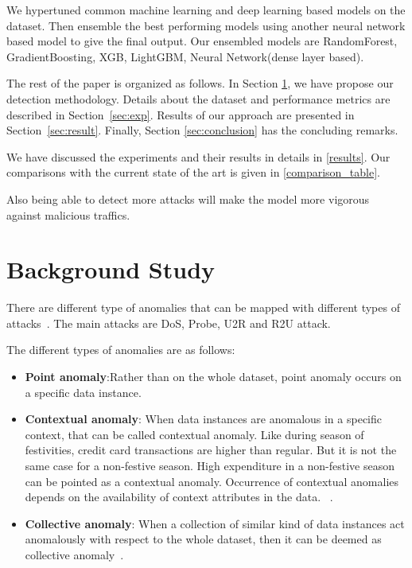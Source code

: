 \documentclass[14pt, conference]{IEEEtran}
\begin{document}
We hypertuned common machine learning and deep learning based models on the dataset. Then ensemble the best performing models using another neural network based model to give the final output. Our ensembled models are RandomForest, GradientBoosting, XGB, LightGBM, Neural Network(dense layer based).

The rest of the paper is organized as follows. In Section \ref{}, we have  propose our detection methodology. Details about the dataset and performance metrics are described in Section~\ref{sec:exp}. Results of our approach are presented in Section~\ref{sec:result}. Finally, Section \ref{sec:conclusion} has the concluding remarks.

We have discussed the experiments and their results in details in \ref{results}. Our comparisons with the current state of the art is given in \ref{comparison_table}.


Also being able to detect more attacks will make the model more vigorous against malicious traffics.


%
\section{Background Study}
 There are different type of anomalies that can be mapped with different types of attacks~\cite{ahmed2016survey}. The main attacks are DoS, Probe, U2R and R2U attack.

The different types of anomalies are as follows:
\begin{itemize}
    \item \textbf{Point anomaly}:Rather than on the whole dataset, point anomaly occurs on a specific data instance.
    \item \textbf{Contextual anomaly}: When data instances are anomalous in a specific context, that can be called contextual anomaly. Like during season of festivities, credit card transactions are higher than regular. But it is not the same case for a non-festive season. High expenditure in a non-festive season can be pointed as a contextual anomaly. Occurrence of contextual anomalies depends on the availability of context attributes in the data. ~\cite{chandola2009anomaly}.
    \item \textbf{Collective anomaly}: When a collection of similar kind of data instances act anomalously with respect to the whole dataset, then it can be deemed as collective anomaly~\cite{ahmed2016survey}.
    
\end{itemize}
\end{document}
